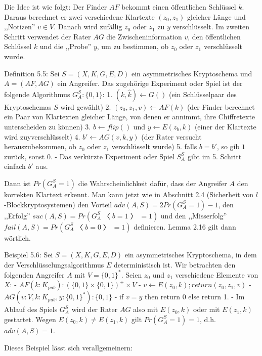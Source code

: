\documentclass[a4paper]{article}
\begin{document}
\begin{multicols}{3}
{{{            Die Idee ist wie folgt: Der Finder $AF$ bekommt einen öffentlichen Schlüssel $k$. Daraus berechnet er zwei verschiedene Klartexte $(z_0,z_1)$ gleicher Länge und ,,Notizen'' $v\in V$. Danach wird zufällig $z_0$ oder $z_1$ zu $y$ verschlüsselt. Im zweiten Schritt verwendet der Rater $AG$ die Zwischeninformation $v$, den öffentlichen Schlüssel $k$ und die ,,Probe'' $y$, um zu bestimmen, ob $z_0$ oder $z_1$ verschlüsselt wurde.

            Definition 5.5: Sei $S=(X,K,G,E,D)$ ein asymmetrisches Kryptoschema und $A=(AF,AG)$ ein Angreifer. Das zugehörige Experiment oder Spiel ist der folgende Algorithmus $G^S_A:\{0,1\}$:
            1. $(k,\hat{k})\leftarrow G()$ (ein Schlüsselpaar des Kryptoschemas $S$ wird gewählt)
            2. $(z_0,z_1,v)\leftarrow AF(k)$ (der Finder berechnet ein Paar von Klartexten gleicher Länge, von denen er annimmt, ihre Chiffretexte unterscheiden zu können)
            3. $b\leftarrow flip()$ und $y\leftarrow E(z_b,k)$ (einer der Klartexte wird zuyverschlüsselt)
            4. $b′\leftarrow AG(v,k,y)$ (der Rater versucht herauszubekommen, ob $z_0$ oder $z_1$ verschlüsselt wurde)
            5. falls $b=b′$, so gib $1$ zurück, sonst $0$.
            - Das verkürzte Experiment oder Spiel $S^S_A$ gibt im 5. Schritt einfach $b′$ aus.

            Dann ist $Pr(G^S_A= 1)$ die Wahrscheinlichkeit dafür, dass der Angreifer $A$ den korrekten Klartext erkennt. Man kann jetzt wie in Abschnitt 2.4 (Sicherheit von $l$-Blockkryptosystemen) den Vorteil $adv(A,S) = 2 Pr(G^S_A = 1)- 1$, den ,,Erfolg'' $suc(A,S) = Pr(G^S_A〈b = 1〉 = 1)$ und den ,,Misserfolg'' $fail(A,S) =Pr(G^S_A〈b= 0〉= 1)$ definieren. Lemma 2.16 gilt dann wörtlich.

            Beispiel 5.6: Sei $S=(X,K,G,E,D)$ ein asymmetrisches Kryptoschema, in dem der Verschlüsselungsalgorithmus $E$ deterministisch ist. Wir betrachten den folgenden Angreifer $A$ mit $V=\{0,1\}^*$. Seien $z_0$ und $z_1$ verschiedene Elemente von $X$:
            - $AF(k:K_{pub}) : (\{0,1\}\times\{0,1\})^+\times V$
            - $v\leftarrow E(z_0,k);return(z_0,z_1,v)$
            - $AG(v:V,k:K_{pub},y:\{0,1\}^*):\{0,1\}$
            - if $v=y$ then return 0 else return 1.
            - Im Ablauf des Spiels $G^S_A$ wird der Rater $AG$ also mit $E(z_0,k)$ oder mit $E(z_1,k)$ gestartet. Wegen $E(z_0,k)\not=E(z_1,k)$ gilt $Pr(G^S_A=1)=1$, d.h. $adv(A,S)=1$.

            Dieses Beispiel lässt sich verallgemeinern:

}}}
\end{multicols}
\end{document}
